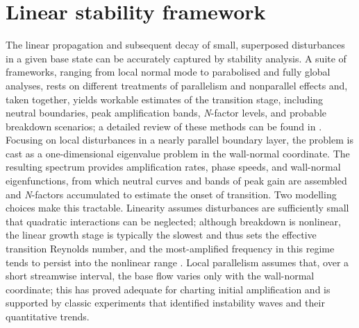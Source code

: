 \section{Linear stability framework}

The linear propagation and subsequent decay of small, superposed disturbances in a given base state can be accurately captured by stability analysis. A suite of frameworks, ranging from local normal mode to parabolised and fully global analyses, rests on different treatments of parallelism and nonparallel effects and, taken together, yields workable estimates of the transition stage, including neutral boundaries, peak amplification bands, \textit{N}-factor levels, and probable breakdown scenarios; a detailed review of these methods can be found in \citep{Theofilis2011}. Focusing on local disturbances in a nearly parallel boundary layer, the problem is cast as a one-dimensional eigenvalue problem in the wall-normal coordinate. The resulting spectrum provides amplification rates, phase speeds, and wall-normal eigenfunctions, from which neutral curves and bands of peak gain are assembled and \textit{N}-factors accumulated to estimate the onset of transition. Two modelling choices make this tractable. Linearity assumes disturbances are sufficiently small that quadratic interactions can be neglected; although breakdown is nonlinear, the linear growth stage is typically the slowest and thus sets the effective transition Reynolds number, and the most-amplified frequency in this regime tends to persist into the nonlinear range \citep{Reshotko2001,Mack1984}. Local parallelism assumes that, over a short streamwise interval, the base flow varies only with the wall-normal coordinate; this has proved adequate for charting initial amplification and is supported by classic experiments that identified instability waves and their quantitative trends.


